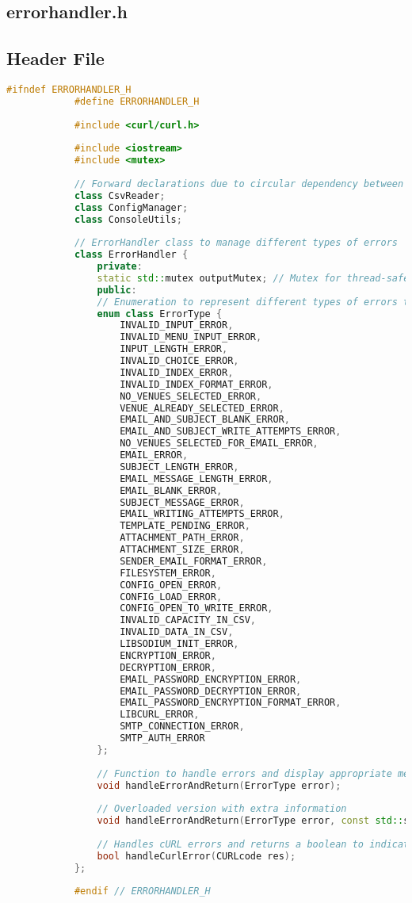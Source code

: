 \documentclass{article}
\begin{document}
	\subsection{errorhandler.h}
	
	\subsection*{Header File}
	\begin{mdframed}[backgroundcolor=background, hidealllines=false, innerleftmargin=15pt, innerrightmargin=5pt, innertopmargin=0pt, innerbottommargin=-5pt, linecolor=accent]
		\begin{lstlisting}[language=C++]
			#ifndef ERRORHANDLER_H
			#define ERRORHANDLER_H
			
			#include <curl/curl.h>
			
			#include <iostream>
			#include <mutex>
			
			// Forward declarations due to circular dependency between fileutils.h and errorhandler.h
			class CsvReader; 
			class ConfigManager;
			class ConsoleUtils; 
			
			// ErrorHandler class to manage different types of errors
			class ErrorHandler {
				private:
				static std::mutex outputMutex; // Mutex for thread-safe output
				public:
				// Enumeration to represent different types of errors that can be encountered
				enum class ErrorType {
					INVALID_INPUT_ERROR,
					INVALID_MENU_INPUT_ERROR,
					INPUT_LENGTH_ERROR,
					INVALID_CHOICE_ERROR,
					INVALID_INDEX_ERROR,
					INVALID_INDEX_FORMAT_ERROR,
					NO_VENUES_SELECTED_ERROR,
					VENUE_ALREADY_SELECTED_ERROR,
					EMAIL_AND_SUBJECT_BLANK_ERROR,
					EMAIL_AND_SUBJECT_WRITE_ATTEMPTS_ERROR,
					NO_VENUES_SELECTED_FOR_EMAIL_ERROR,
					EMAIL_ERROR,
					SUBJECT_LENGTH_ERROR,
					EMAIL_MESSAGE_LENGTH_ERROR,
					EMAIL_BLANK_ERROR,
					SUBJECT_MESSAGE_ERROR,
					EMAIL_WRITING_ATTEMPTS_ERROR,
					TEMPLATE_PENDING_ERROR,
					ATTACHMENT_PATH_ERROR,
					ATTACHMENT_SIZE_ERROR,
					SENDER_EMAIL_FORMAT_ERROR,
					FILESYSTEM_ERROR,
					CONFIG_OPEN_ERROR,
					CONFIG_LOAD_ERROR,
					CONFIG_OPEN_TO_WRITE_ERROR,
					INVALID_CAPACITY_IN_CSV,
					INVALID_DATA_IN_CSV,
					LIBSODIUM_INIT_ERROR,
					ENCRYPTION_ERROR,
					DECRYPTION_ERROR,
					EMAIL_PASSWORD_ENCRYPTION_ERROR,
					EMAIL_PASSWORD_DECRYPTION_ERROR,
					EMAIL_PASSWORD_ENCRYPTION_FORMAT_ERROR,
					LIBCURL_ERROR,
					SMTP_CONNECTION_ERROR,
					SMTP_AUTH_ERROR
				};
				
				// Function to handle errors and display appropriate messages based on the type of error
				void handleErrorAndReturn(ErrorType error);
				
				// Overloaded version with extra information
				void handleErrorAndReturn(ErrorType error, const std::string& extraInfo);
				
				// Handles cURL errors and returns a boolean to indicate success/failure
				bool handleCurlError(CURLcode res);
			};
			
			#endif // ERRORHANDLER_H
		\end{lstlisting}
	\end{mdframed}
	
\end{document}
